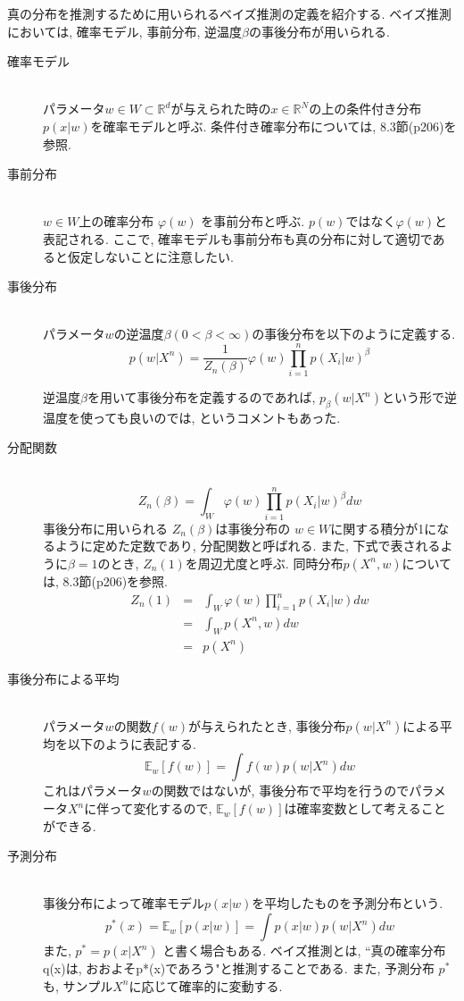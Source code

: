 \documentclass[11pt,a4paper]{jsarticle}
\begin{document}
真の分布を推測するために用いられるベイズ推測の定義を紹介する. ベイズ推測においては, 確率モデル, 事前分布, 逆温度$\beta$の事後分布が用いられる.
\begin{description}
\item[確率モデル]\mbox{}\\
パラメータ$w \in W \subset \mathbb{R}^d$が与えられた時の$x\in \mathbb{R}^N$の上の条件付き分布$p(x|w)$を確率モデルと呼ぶ. 条件付き確率分布については, 8.3節(p206)を参照.

\item[事前分布]\mbox{}\\
$w \in W$上の確率分布 $\varphi(w)$ を事前分布と呼ぶ. $p(w)$ではなく$\varphi(w)$と表記される. ここで, 確率モデルも事前分布も真の分布に対して適切であると仮定しないことに注意したい.

\item[事後分布]\mbox{}\\
パラメータ$w$の逆温度$\beta (0 < \beta < \infty)$の事後分布を以下のように定義する.
\[ p(w|X^n) = \frac{1}{Z_{n}(\beta)}\varphi(w)\prod_{i=1}^{n}p(X_i|w)^{\beta} \tag{1.5}\]

逆温度$\beta$を用いて事後分布を定義するのであれば, $p_{\beta}(w|X^n)$という形で逆温度を使っても良いのでは, というコメントもあった.

\item[分配関数]\mbox{}\\
\[ Z_n(\beta) = \int_W \varphi(w)\prod_{i=1}^{n}p(X_i|w)^{\beta} dw  \tag{1.6}\]
事後分布に用いられる $Z_n(\beta)$は事後分布の $w \in W$に関する積分が1になるように定めた定数であり, 分配関数と呼ばれる. また, 下式で表されるように$\beta = 1$のとき, $Z_n(1)$を周辺尤度と呼ぶ. 同時分布$p(X^n, w)$については, 8.3節(p206)を参照.
\begin{eqnarray*}
Z_n(1) &=& \int_W \varphi(w)\prod_{i=1}^{n}p(X_i|w)dw \\
&=& \int_W p(X^n,  w) dw \\
&=& p(X^n)
\end{eqnarray*}

\item[事後分布による平均]\mbox{}\\
パラメータ$w$の関数$f(w)$が与えられたとき, 事後分布$p(w|X^n)$による平均を以下のように表記する.
\[ \mathbb{E}_{w}[f(w)] = \int f(w)p(w|X^n) dw \tag{1.7} \]
これはパラメータ$w$の関数ではないが, 事後分布で平均を行うのでパラメータ$X^n$に伴って変化するので, $\mathbb{E}_{w}[f(w)]$は確率変数として考えることができる.

\item[予測分布]\mbox{}\\
事後分布によって確率モデル$p(x|w)$を平均したものを予測分布という.
\[ p^{*}(x) = \mathbb{E}_{w}[p(x|w)] = \int p(x|w)p(w|X^n)dw \tag{1.8}\]
また, $p^{*} = p(x|X^n)$ と書く場合もある. ベイズ推測とは, ``真の確率分布q(x)は, おおよそp*(x)であろう"と推測することである. また, 予測分布 $p^{*}$も, サンプル$X^n$に応じて確率的に変動する. 
\end{description}
\end{document}
